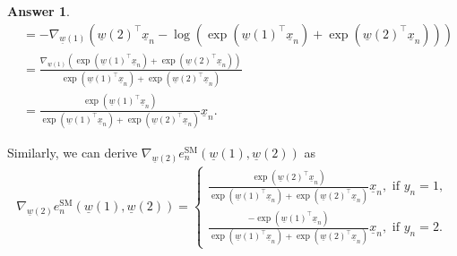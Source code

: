 \documentclass{article}
\theoremstyle{definition}
\newtheorem*{answer}{Answer}
\begin{document}
\begin{question}[start=0]
\begin{question}
\begin{answer}
\begin{align*}
				&= - \nabla_{\!\underline{w}(1)} \left(\underline{w}(2)^\top \underline{x}_n - \log\left(\exp(\underline{w}(1)^\top\underline{x}_n) + \exp(\underline{w}(2)^\top\underline{x}_n)\right)\right)\\
				&= \frac{\nabla_{\!\underline{w}(1)}\left(\exp(\underline{w}(1)^\top\underline{x}_n) + \exp(\underline{w}(2)^\top\underline{x}_n)\right)}{\exp(\underline{w}(1)^\top\underline{x}_n) + \exp(\underline{w}(2)^\top\underline{x}_n)}\\
				&=  \frac{\exp(\underline{w}(1)^\top\underline{x}_n)}{\exp(\underline{w}(1)^\top\underline{x}_n) + \exp(\underline{w}(2)^\top\underline{x}_n)}\underline{x}_n.
			\end{align*}
			
			Similarly, we can derive $\nabla_{\!\underline{w}(2)}e^{\text{SM}}_{n}(\underline{w}(1), \underline{w}(2))$ as
			\begin{align*}
				\nabla_{\!\underline{w}(2)}e^{\text{SM}}_{n}(\underline{w}(1), \underline{w}(2)) = \begin{cases*}
					\frac{\exp(\underline{w}(2)^\top\underline{x}_n)}{\exp(\underline{w}(1)^\top\underline{x}_n) + \exp(\underline{w}(2)^\top\underline{x}_n)}\underline{x}_n,\text{ if }y_n=1,\\
					\frac{-\exp(\underline{w}(1)^\top\underline{x}_n)}{\exp(\underline{w}(1)^\top\underline{x}_n) + \exp(\underline{w}(2)^\top\underline{x}_n)}\underline{x}_n,\text{ if }y_n=2.
				\end{cases*}
			\end{align*}
		\end{answer}
		

\end{question}
\end{question}
\end{document}
